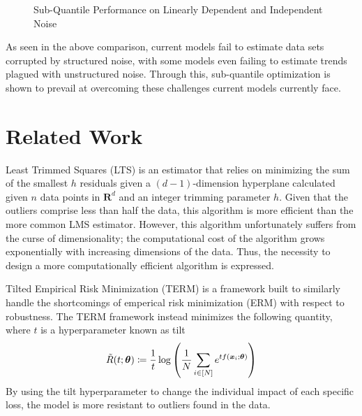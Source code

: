 \documentclass{article} %
\begin{document}
\begin{figure}[!t]
		\caption{Sub-Quantile Performance on Linearly Dependent and Independent Noise}
		\label{fig:structure-unstructured-noise}
	\end{figure}
	
	As seen in the above comparison, current models fail to estimate data sets corrupted by structured noise, with some models even failing to estimate trends plagued with unstructured noise. Through this, sub-quantile optimization is shown to prevail at overcoming these challenges current models currently face.
	
	\section{Related Work}
	Least Trimmed Squares (LTS) \cite{LTS} is an estimator that relies on minimizing the sum of the smallest $h$ residuals given a $(d-1)$-dimension hyperplane calculated given $n$ data points in $\mathbf{R}^d$ and an integer trimming parameter $h$. Given that the outliers comprise less than half the data, this algorithm is more efficient than the more common LMS estimator. However, this algorithm unfortunately suffers from the curse of dimensionality; the computational cost of the algorithm grows exponentially with increasing dimensions of the data. Thus, the necessity to design a more computationally efficient algorithm is expressed.
	
	Tilted Empirical Risk Minimization (TERM) \cite{li2020tilted} is a framework built to similarly handle the shortcomings of emperical risk minimization (ERM) with respect to robustness. The TERM framework instead minimizes the following quantity, where $t$ is a hyperparameter known as tilt
	\begin{equation}
		\tilde{R}(t;{\bm{\theta}}) \coloneqq \frac{1}{t} \log\left(\frac{1}{N}\sum_{i \in \left[N\right]}e^{tf({\bm{x}}_i;{\bm{\theta}})} \right)
	\end{equation}
	By using the tilt hyperparameter to change the individual impact of each specific loss, the model is more resistant to outliers found in the data.
	
\end{document}
